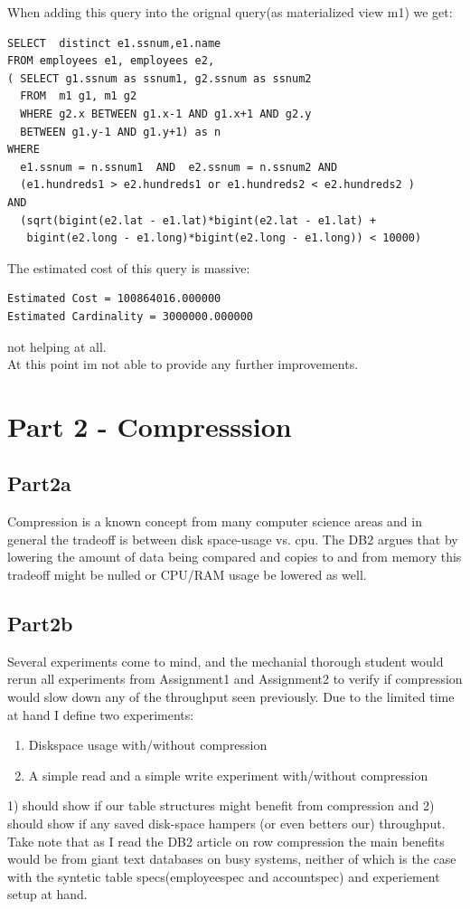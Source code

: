 When adding this query into the orignal query(as materialized view m1) we get:
\begin{verbatim}
SELECT  distinct e1.ssnum,e1.name
FROM employees e1, employees e2,
( SELECT g1.ssnum as ssnum1, g2.ssnum as ssnum2 
  FROM  m1 g1, m1 g2 
  WHERE g2.x BETWEEN g1.x-1 AND g1.x+1 AND g2.y 
  BETWEEN g1.y-1 AND g1.y+1) as n
WHERE
  e1.ssnum = n.ssnum1  AND  e2.ssnum = n.ssnum2 AND
  (e1.hundreds1 > e2.hundreds1 or e1.hundreds2 < e2.hundreds2 )
AND
  (sqrt(bigint(e2.lat - e1.lat)*bigint(e2.lat - e1.lat) + 
   bigint(e2.long - e1.long)*bigint(e2.long - e1.long)) < 10000)
\end{verbatim}

The estimated cost of this query is massive:
\begin{verbatim}
Estimated Cost = 100864016.000000
Estimated Cardinality = 3000000.000000
\end{verbatim}
not helping at all.\\

At this point im not able to provide any further improvements.


\chapter{Part 2 - Compresssion}
\section{Part2a}
Compression is a known concept from many computer science areas and in general
the tradeoff is between disk space-usage vs. cpu. The DB2 argues that by
lowering the amount of data being compared and copies to and from memory this
tradeoff might be nulled or CPU/RAM usage be lowered as well.

\section{Part2b}
Several experiments come to mind, and the mechanial thorough student would rerun
all experiments from Assignment1 and Assignment2 to verify if compression would
slow down any of the throughput seen previously. Due to the limited time at hand
I define two experiments:
\begin{enumerate}
  \item Diskspace usage with/without compression
  \item A simple read and a simple write experiment with/without compression
\end{enumerate}
1) should show if our table structures might benefit from compression and 2)
should show if any saved disk-space hampers (or even betters our) throughput.
Take note that as I read the DB2 article on row compression the main benefits
would be from giant text databases on busy systems, neither of which is the case
with the syntetic table specs(employeespec and accountspec) and experiement
setup at hand. 

